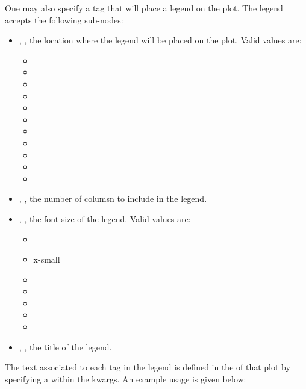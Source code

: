 One may also specify a  tag that will place a legend on the plot.
The legend accepts the following sub-nodes:

\begin{itemize}
  \item {}, , the location where the legend will be placed on the plot. Valid values are:
  \begin{itemize}
    \item {}
    \item {}
    \item {}
    \item {}
    \item {}
    \item {}
    \item {}
    \item {}
    \item {}
    \item {}
    \item {}
  \end{itemize}
  \item {}, , the number of columsn to include in the legend.
  \item {}, , the font size of the legend. Valid values are:
  \begin{itemize}
    \item {}
    \item x-small
    \item {}
    \item {}
    \item {}
    \item {}
    \item {}
  \end{itemize}
  \item {}, , the title of the legend.
\end{itemize}

\nb The text associated to each  tag in the legend is defined in the  of that plot by specifying a  within the kwargs.
An example usage is given below:

